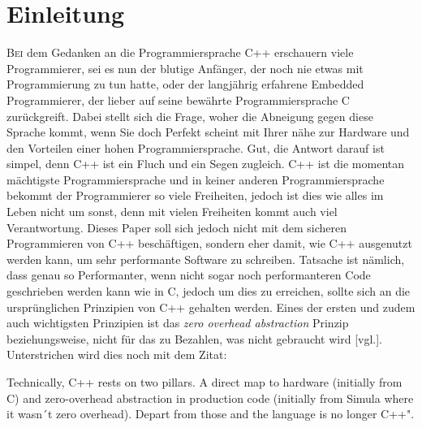 \section{Einleitung}
\lettrine{B}{ei} dem Gedanken an die Programmiersprache C++ erschauern viele Programmierer, sei
es nun der blutige Anfänger, der noch nie etwas mit Programmierung zu tun hatte, oder der
langjährig erfahrene Embedded Programmierer, der lieber auf seine bewährte Programmiersprache C
zurückgreift. Dabei stellt sich die Frage, woher die Abneigung gegen diese Sprache kommt, wenn
Sie doch Perfekt scheint mit Ihrer nähe zur Hardware und den Vorteilen einer hohen
Programmiersprache. Gut, die Antwort darauf ist simpel, denn C++ ist ein Fluch und ein Segen
zugleich. C++ ist die momentan mächtigste Programmiersprache und in keiner anderen
Programmiersprache bekommt der Programmierer so viele Freiheiten, jedoch ist dies wie alles im
Leben nicht um sonst, denn mit vielen Freiheiten kommt auch viel Verantwortung.
\newline
\newline
Dieses Paper soll sich jedoch nicht mit dem sicheren Programmieren von C++ beschäftigen, sondern
eher damit, wie C++ ausgenutzt werden kann, um sehr performante Software zu schreiben. Tatsache
ist nämlich, dass genau so Performanter, wenn nicht sogar noch performanteren Code geschrieben
werden kann wie in C, jedoch um dies zu erreichen, sollte sich an die ursprünglichen Prinzipien
von C++ gehalten werden. Eines der ersten und zudem auch wichtigsten Prinzipien ist das
\emph{zero overhead abstraction} Prinzip beziehungsweise, nicht für das zu Bezahlen, was nicht
gebraucht wird \cite{HandsOn}[vgl.]. Unterstrichen wird dies noch mit dem Zitat:
\begin{zitat}
    Technically, C++ rests on two pillars. A direct map to hardware (initially from C) and zero-overhead
    abstraction in production code (initially from Simula where it wasn´t zero overhead). Depart from
    those and the language is no longer C++"\cite{ISOC++}.
\end{zitat}

		
		
